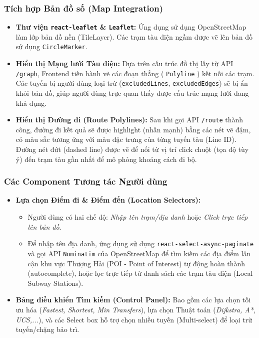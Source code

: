 \documentclass[12pt,a4paper]{article}
\begin{document}
\subsubsection{Tích hợp Bản đồ số (Map Integration)}
\begin{itemize}
    \item \textbf{Thư viện \texttt{react-leaflet} \& \texttt{Leaflet}:} Ứng dụng sử dụng OpenStreetMap làm lớp bản đồ nền (TileLayer). Các trạm tàu điện ngầm được vẽ lên bản đồ sử dụng \texttt{CircleMarker}.
    \item \textbf{Hiển thị Mạng lưới Tàu điện:} Dựa trên cấu trúc đồ thị lấy từ API \texttt{/graph}, Frontend tiến hành vẽ các đoạn thẳng ( \texttt{Polyline} ) kết nối các trạm. Các tuyến bị người dùng loại trừ (\texttt{excludedLines}, \texttt{excludedEdges}) sẽ bị ẩn khỏi bản đồ, giúp người dùng trực quan thấy được cấu trúc mạng lưới đang khả dụng.
    \item \textbf{Hiển thị Đường đi (Route Polylines):} Sau khi gọi API \texttt{/route} thành công, đường đi kết quả sẽ được highlight (nhấn mạnh) bằng các nét vẽ đậm, có màu sắc tương ứng với màu đặc trưng của từng tuyến tàu (Line ID). Đường nét đứt (dashed line) được vẽ để nối từ vị trí click chuột (tọa độ tùy ý) đến trạm tàu gần nhất để mô phỏng khoảng cách đi bộ.
\end{itemize}

\subsubsection{Các Component Tương tác Người dùng}
\begin{itemize}
    \item \textbf{Lựa chọn Điểm đi \& Điểm đến (Location Selectors):}
    \begin{itemize}
        \item Người dùng có hai chế độ: \textit{Nhập tên trạm/địa danh} hoặc \textit{Click trực tiếp lên bản đồ}.
        \item Để nhập tên địa danh, ứng dụng sử dụng \texttt{react-select-async-paginate} và gọi API \texttt{Nominatim} của OpenStreetMap để tìm kiếm các địa điểm lân cận khu vực Thượng Hải (POI - Point of Interest) tự động hoàn thành (autocomplete), hoặc lọc trực tiếp từ danh sách các trạm tàu điện (Local Subway Stations).
    \end{itemize}
    \item \textbf{Bảng điều khiển Tìm kiếm (Control Panel):} Bao gồm các lựa chọn tối ưu hóa (\textit{Fastest, Shortest, Min Transfers}), lựa chọn Thuật toán (\textit{Dijkstra, A*, UCS,...}), và các Select box hỗ trợ chọn nhiều tuyến (Multi-select) để loại trừ tuyến/chặng bảo trì.
\end{itemize}
\end{document}
